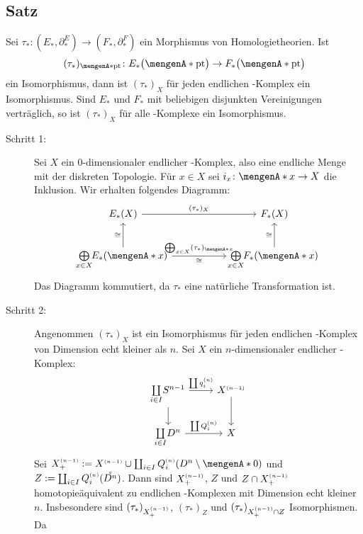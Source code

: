 \subsection[Satz: Isomorphie der Homologie von \CW-Komplexen von zwei Homologietheorien]{Satz} %
\label{sub:149}
Sei $\tau_* \colon (E_*,\partial_*^E) \to (F_*,\partial_*^F)$ ein Morphismus von Homologietheorien. Ist 
\[
	(\tau_*)_{\set{\mathrm{pt}}} \colon E_*\enbrace[\big]{\set{\mathrm{pt}}} \to F_* \enbrace[\big]{\set{\mathrm{pt}}}
\]
ein Isomorphismus, dann ist $(\tau_*)_X$ für jeden endlichen \CW-Komplex ein 
Isomorphismus. Sind $E_*$ und $F_*$ mit beliebigen disjunkten Vereinigungen verträglich, so ist $(\tau_*)_X$ für alle \CW-Komplexe ein Isomorphismus.
\begin{description}
	\item[Schritt 1:] Sei $X$ ein $0$-dimensionaler endlicher \CW-Komplex, also eine endliche Menge mit der diskreten Topologie. Für $x \in X$ sei $i_x \colon \set{x} \to X$
	die Inklusion. Wir erhalten folgendes Diagramm:
	\[
		\begin{tikzcd}[column sep=5.5em, row sep=2.5em]
			E_*(X) \rar["(\tau_*)_X"] & F_*(X) \\
			\bigoplus\limits_{\mathclap{x \in X}} E_*(\set{x}) \uar["\cong"] \rar["\bigoplus_{x \in X} (\tau_*)_{\set{x}}","\cong"'] 
			& \bigoplus\limits_{\mathclap{x \in X}} F_*(\set{x}) \uar["\cong"]
		\end{tikzcd}
	\]
	Das Diagramm kommutiert, da $\tau_*$ eine natürliche Transformation ist.
	\item[Schritt 2:] Angenommen $(\tau_*)_X$ ist ein Isomorphismus für jeden endlichen \CW-Komplex von Dimension echt kleiner als $n$. Sei $X$ ein $n$-dimensionaler
	endlicher \CW-Komplex:
	\[
		\begin{tikzcd}
			\coprod\limits_{\mathclap{i \in I}} S^{n-1} \rar["\coprod q_i^\ssbrace{n}"] \dar & X^\ssbrace{n-1} \dar\\
			\coprod\limits_{\mathclap{i \in I}} D^{n} \rar["\coprod Q_i^\ssbrace{n}"] & X
		\end{tikzcd}
	\]
	Sei $X_+^\ssbrace{n-1} := X^\ssbrace{n-1} \cup \coprod_{i \in I} Q^\ssbrace{n}_i \enbrace*{D^n \setminus \set{0}}$ und 
	$Z := \coprod_{i \in I} Q^{\scriptscriptstyle(n)}_i(\mathring{D^n})$. Dann sind $X^{\scriptscriptstyle(n-1)}_+$, $Z$ und $Z\cap X_+^{\scriptscriptstyle(n-1)}$ homotopieäquivalent zu endlichen \CW-Komplexen
	mit Dimension echt kleiner $n$. Insbesondere sind $(\tau_*)_{X_+^{\scriptscriptstyle(n-1)}}$, $(\tau_*)_Z$ und $(\tau_*)_{X^{\scriptscriptstyle(n-1)}_+ \cap Z}$ Isomorphismen. Da

\end{description}
